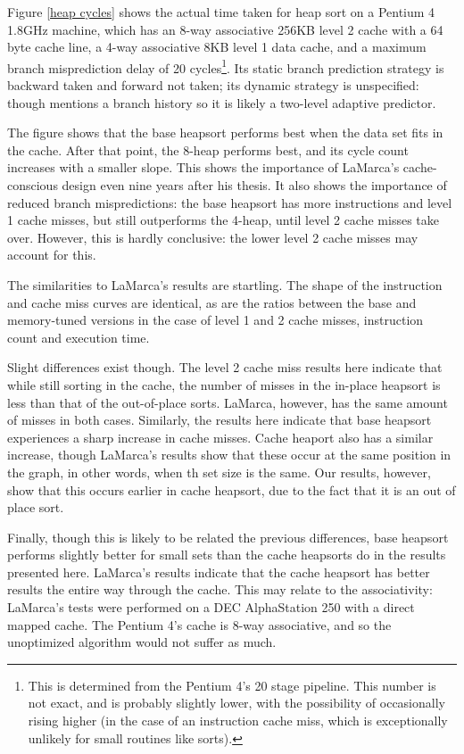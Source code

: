 Figure \ref{heap cycles} shows the actual time taken for heap sort on a Pentium
4 1.8GHz machine, which has an 8-way associative 256KB level 2 cache with a 64 byte
cache line, a 4-way associative 8KB level 1 data cache, and a maximum branch
misprediction delay of 20 cycles\footnote{This is determined from the Pentium
4's 20 stage pipeline. This number is not exact, and is probably slightly lower,
with the possibility of occasionally rising higher (in the case of an
instruction cache miss, which is exceptionally unlikely for small routines like
sorts).}. Its static branch prediction strategy is backward taken and forward
not taken; its dynamic strategy is unspecified: though \cite{Intel248966-010}
mentions a branch history so it is likely a two-level adaptive predictor.

The figure shows that the base heapsort performs best when the data set fits in
the cache. After that point, the 8-heap performs best, and its cycle count increases
with a smaller slope. This shows the importance of LaMarca's cache-conscious
design even nine years after his thesis. It also shows the importance of reduced
branch mispredictions: the base heapsort has more instructions and level 1 cache
misses, but still outperforms the 4-heap, until level 2 cache misses take over.
However, this is hardly conclusive: the lower level 2 cache misses may account
for this.

The similarities to LaMarca's results are startling. The shape of the
instruction and cache miss curves are identical, as are the ratios between the
base and memory-tuned versions in the case of level 1 and 2 cache misses,
instruction count and execution time.

Slight differences exist though. The level 2 cache miss results here indicate
that while still sorting in the cache, the number of misses in the in-place
heapsort is less than that of the out-of-place sorts. LaMarca, however, has the
same amount of misses in both cases. Similarly, the results here indicate that
base heapsort experiences a sharp increase in cache misses. Cache heaport also
has a similar increase, though LaMarca's results show that these occur at the
same position in the graph, in other words, when th set size is the same. Our
results, however, show that this occurs earlier in cache heapsort, due to the
fact that it is an out of place sort.

Finally, though this is likely to be related the previous differences, base
heapsort performs slightly better for small sets than the cache heapsorts do in
the results presented here. LaMarca's results indicate that the cache heapsort
has better results the entire way through the cache. This may relate to the
associativity: LaMarca's tests were performed on a DEC AlphaStation 250 with a
direct mapped cache. The Pentium 4's cache is 8-way associative, and so the
unoptimized algorithm would not suffer as much.

